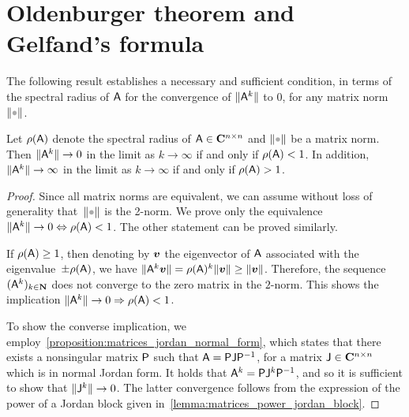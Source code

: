 \section{Oldenburger theorem and Gelfand's formula}
The following result establishes a necessary and sufficient condition,
in terms of the spectral radius of $\mathsf A$ for the convergence of $\lVert\mathsf A^k\rVert$ to 0,
for any matrix norm $\norm{\placeholder}$.
\begin{proposition}
    [Oldenburger]
    \label{proposition:matrices_convergence_power_of_matrix}
    Let $\rho(\mathsf A)$ denote the spectral radius of $\mathsf A \in \mathbf C^{n \times n}$ and $\norm{\placeholder}$ be a matrix norm.
    Then $\lVert\mathsf A^k\rVert \to 0$ in the limit as $k \to \infty$ if and only if $\rho(\mathsf A) < 1$.
    In addition, $\lVert\mathsf A^k\rVert \to \infty$ in the limit as $k \to \infty$ if and only if $\rho(\mathsf A) > 1$.
\end{proposition}
\begin{proof}
    Since all matrix norms are equivalent,
    we can assume without loss of generality that~$\norm{\placeholder}$ is the 2-norm.
    We prove only the equivalence $\lVert\mathsf A^k\rVert \to 0 \Leftrightarrow \rho(\mathsf A) < 1$.
    The other statement can be proved similarly.

    If $\rho(\mathsf A) \geq 1$,
    then denoting by $\mathbf{\boldsymbol{v}}$ the eigenvector of $\mathsf A$ associated with the eigenvalue~$\pm \rho(\mathsf A)$,
    we have $\lVert\mathsf A^k \mathbf{\boldsymbol{v}}\rVert = \rho(\mathsf A)^k \lVert\mathbf{\boldsymbol{v}}\rVert \geq \lVert\mathbf{\boldsymbol{v}}\rVert$.
    Therefore, the sequence $(\mathsf A^k)_{k \in \mathbf N}$ does not converge to the zero matrix in the $2$-norm.
    This shows the implication $\lVert\mathsf A^k\rVert \to 0 \Rightarrow \rho(\mathsf A) < 1$.

    To show the converse implication,
    we employ~\cref{proposition:matrices_jordan_normal_form},
    which states that there exists a nonsingular matrix $\mathsf P$ such that $\mathsf A = \mathsf P \mathsf J \mathsf P^{-1}$,
    for a matrix $\mathsf J \in \mathbf C^{n \times n}$ which is in normal Jordan form.
    It holds that $\mathsf A^k = \mathsf P \mathsf J^k \mathsf P^{-1}$,
    and so it is sufficient to show that $\lVert\mathsf J^k\rVert \to 0$.
    The latter convergence follows from the expression of the power of a Jordan block given in~\cref{lemma:matrices_power_jordan_block}.
\end{proof}

